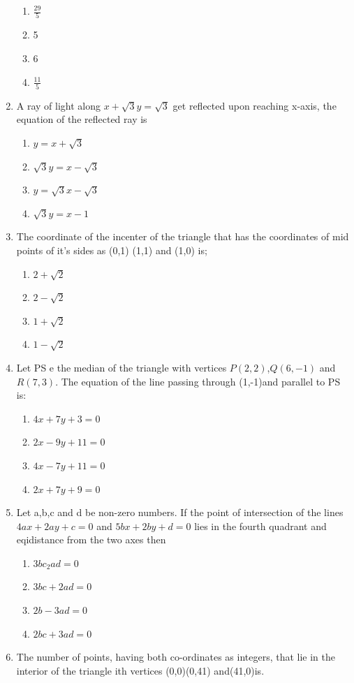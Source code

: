 \documentclass[12pt]{article}
\begin{document}
\begin{enumerate}
\begin{enumerate}
\item $\frac{29}{5}$ 
\item 5 
\item 6 
\item $\frac{11}{5}$
\end{enumerate}
\item  A ray of light along $x+\sqrt{3}y=\sqrt{3}$ get reflected upon reaching x-axis, the equation of the reflected ray is
\begin{enumerate}
\item $y=x+\sqrt{3}$ 
\item $\sqrt{3}y=x-\sqrt{3}$ 
\item $y=\sqrt{3}x-\sqrt{3}$ 
\item $\sqrt{3}y=x-1$ 
\end{enumerate}
\item  The coordinate of the incenter of the triangle that has the coordinates of mid points of it's sides as (0,1) (1,1) and (1,0) is;
\begin{enumerate}
\item $2+\sqrt{2}$
\item $2-\sqrt{2}$ 
\item $1+\sqrt{2}$ 
\item $1-\sqrt{2}$
\end{enumerate}
\item  Let PS e the median of the triangle with vertices $P(2,2)$,$Q(6,-1)$ and $R(7,3)$. The equation of the line passing through (1,-1)and parallel to PS is:
\begin{enumerate}
\item $4x+7y+3=0$ 
\item $2x-9y+11=0$ 
\item $4x-7y+11=0$ 
\item $2x+7y+9=0$ 
\end{enumerate}
\item  Let a,b,c and d be non-zero numbers. If the point of intersection of the lines $4ax+2ay+c=0$ and $5bx+2by+d=0$ lies in the fourth quadrant and eqidistance from the two axes then 
\begin{enumerate}
\item $3bc_2ad=0$  
\item $3bc+2ad=0$
\item $2b-3ad=0$ 
\item $2bc+3ad=0$
\end{enumerate}
\item  The number of points, having both co-ordinates as integers, that lie in the interior of the triangle ith vertices (0,0)(0,41) and(41,0)is.

\end{enumerate}
\end{document}
